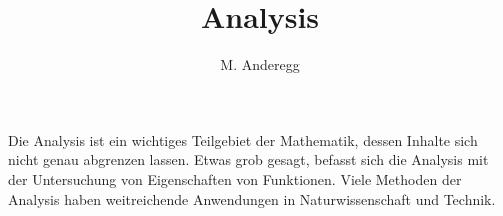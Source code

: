 \documentclass[a4paper, 11pt]{article}
\begin{document}
\title{Analysis}
\author{M. Anderegg}
\date{} %
\maketitle
Die Analysis ist ein wichtiges Teilgebiet
der Mathematik, dessen Inhalte sich nicht genau abgrenzen
lassen. Etwas grob gesagt, befasst sich die Analysis mit
der Untersuchung von Eigenschaften von Funktionen.
Viele Methoden der Analysis haben weitreichende
Anwendungen in Naturwissenschaft und Technik.




\clearpage



\newpage

\newpage

\clearpage

\clearpage

\clearpage

\clearpage



\clearpage

\clearpage

\clearpage




\clearpage

\clearpage

\clearpage

\clearpage

\clearpage

\clearpage

\end{document}
